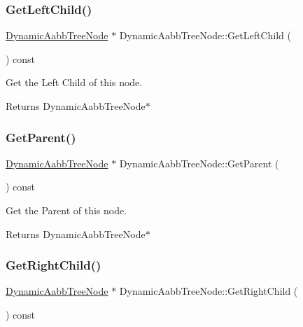 \subsubsection{\texorpdfstring{Get\+Left\+Child()}{GetLeftChild()}}
{\footnotesize\ttfamily \hyperlink{classDynamicAabbTreeNode}{Dynamic\+Aabb\+Tree\+Node} $\ast$ Dynamic\+Aabb\+Tree\+Node\+::\+Get\+Left\+Child (\begin{DoxyParamCaption}{ }\end{DoxyParamCaption}) const}



Get the Left Child of this node. 

\begin{DoxyReturn}{Returns}
Dynamic\+Aabb\+Tree\+Node$\ast$ 
\end{DoxyReturn}
\mbox{\label{classDynamicAabbTreeNode_ad744f2b406abe153f6e4fc07f00d7b62}} 
\subsubsection{\texorpdfstring{Get\+Parent()}{GetParent()}}
{\footnotesize\ttfamily \hyperlink{classDynamicAabbTreeNode}{Dynamic\+Aabb\+Tree\+Node} $\ast$ Dynamic\+Aabb\+Tree\+Node\+::\+Get\+Parent (\begin{DoxyParamCaption}{ }\end{DoxyParamCaption}) const}



Get the Parent of this node. 

\begin{DoxyReturn}{Returns}
Dynamic\+Aabb\+Tree\+Node$\ast$ 
\end{DoxyReturn}
\mbox{\label{classDynamicAabbTreeNode_a0a1ff4b73424133fcd437a19ac77a320}} 
\subsubsection{\texorpdfstring{Get\+Right\+Child()}{GetRightChild()}}
{\footnotesize\ttfamily \hyperlink{classDynamicAabbTreeNode}{Dynamic\+Aabb\+Tree\+Node} $\ast$ Dynamic\+Aabb\+Tree\+Node\+::\+Get\+Right\+Child (\begin{DoxyParamCaption}{ }\end{DoxyParamCaption}) const}



